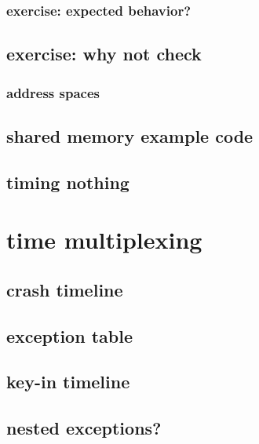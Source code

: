 
\subsubsection{exercise: expected behavior?}


\subsection{exercise: why not check}


\subsubsection{address spaces}


\subsection{shared memory example code}


\subsection{timing nothing}


\section{time multiplexing}


\subsection{crash timeline}


\subsection{exception table}


\subsection{key-in timeline}


\subsection{nested exceptions?}



